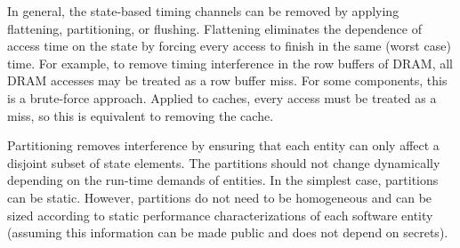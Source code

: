 In general, the state-based 
timing channels can be removed by applying flattening, partitioning, or 
flushing.
Flattening eliminates the dependence of access time on the state by forcing 
every access to finish in the same (worst case) time. For example, to remove timing 
interference in the row buffers of DRAM, all DRAM accesses may be treated as 
a row buffer miss.
For some components, this is a 
brute-force approach. Applied to caches, every access must be treated as a 
miss, so this is equivalent to removing the cache. 

Partitioning removes interference by ensuring that each entity can
only affect a disjoint subset of state elements. The partitions
should not change dynamically depending on the run-time demands of entities.
In the simplest case, partitions can be static.
However, partitions do not need to be homogeneous and can be sized according 
to static performance characterizations of each software entity (assuming this 
information can be made public and does not depend on secrets).


